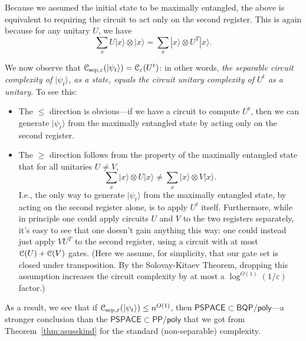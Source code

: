 \documentclass[12pt]{report}
\theoremstyle{plain}
\theoremstyle{definition}
\newcommand{\eps}{\varepsilon}
\renewcommand{\ket}[1]{|#1\rangle}
\begin{document}
Because we assumed the initial state to be maximally entangled, the above is equivalent to requiring the circuit to act only on the second register.  This is again because for any unitary $U$, we have
$$\sum_x U \ket{x} \otimes \ket{x} = \sum_x \ket{x} \otimes U^T \ket{x}.$$

We now observe that ${\cal C}_{\mathrm{sep},\eps}(\ket{\psi_t}) =
{\cal C}_\eps (U^t)$: in other words, {\em the separable circuit complexity of $\ket{\psi_t}$, as a state, equals the circuit unitary complexity of $U^t$ as a unitary}.
To see this:
\begin{itemize}
\item The $\le$ direction is obvious---if we have a circuit to compute $U^t$, then we can generate $\ket{\psi_t}$ from the maximally entangled state by acting only on the second register.
\item The $\ge$ direction follows from the property of the maximally entangled state that for all unitaries $U \neq V$,
$$\sum_x \ket{x} \otimes U \ket{x} \neq \sum_x \ket{x} \otimes V \ket{x}.$$
I.e., the only way to generate $\ket{\psi_t}$ from the maximally entangled state, by acting on the second register alone, is to apply $U^t$ itself. Furthermore, while in principle one could apply circuits $U$ and $V$ to the two registers separately, it's easy to see that one doesn't gain anything this way: one could instead just apply $VU^{T}$ to the second register, using a circuit with at most ${\cal C}(U)+{\cal C}(V)$ gates.  (Here we assume, for simplicity, that our gate set is closed under transposition.  By the Solovay-Kitaev Theorem, dropping this assumption increases the circuit complexity by at most a $\log^{O(1)}(1/\eps)$ factor.)
\end{itemize}
As a result, we see that if ${\cal C}_{\mathrm{sep},\eps}(\ket{\psi_t}) \le n^{O(1)}$, then $\mathsf{PSPACE} \subset \mathsf{BQP/poly}$---a stronger conclusion than the $\mathsf{PSPACE} \subset \mathsf{PP/poly}$ that we got from Theorem~\ref{thm:asusskind} for the standard (non-separable) complexity.
\end{document}
